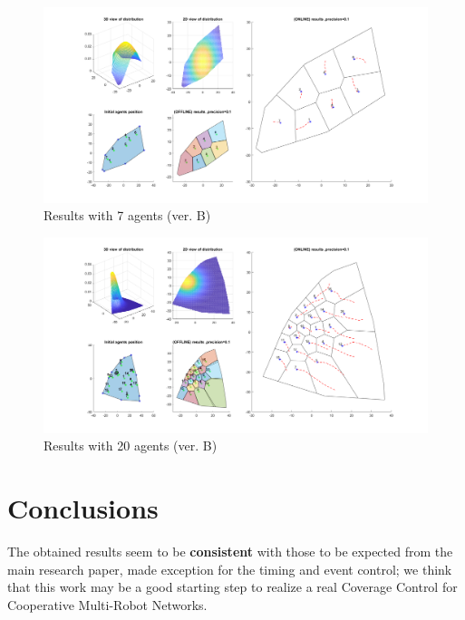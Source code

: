 \documentclass[a4paper,11pt,oneside]{book}
\begin{document}
	\begin{figure}	
		\centering	
		\includegraphics[scale=0.45,angle=90]{figs/convergenceResultsB.png}
		\caption{Results with 7 agents (ver. B)}\label{fig:convergenceResultsB.png}	
	\end{figure}
	
	\begin{figure}	
		\centering	
		\includegraphics[scale=0.45, angle=90]{figs/20convergenceResultsB.png}
		\caption{Results with 20 agents (ver. B)}\label{fig:20convergenceResultsB.png}	
	\end{figure}
	
	
	
	\chapter*{Conclusions} %
	The obtained results seem to be \textbf{consistent} with those to be expected from the main research paper, made exception for the timing and event control; we think that this work may be a good starting step to realize a real Coverage Control for Cooperative Multi-Robot Networks.\\\\
	
\end{document}
